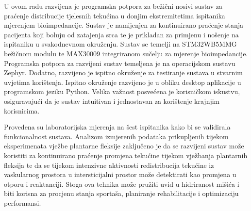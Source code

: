 \documentclass[../diplomski_rad.tex]{subfiles}
\begin{document}
\sloppy

\justifying

U ovom radu razvijena je programska potpora za bežični nosivi sustav za praćenje distribucije tjelesnih tekućina u donjim ekstremitetima
ispitanika mjerenjem bioimpedancije. 
Sustav je namijenjen za kontinuirano praćenje stanja pacijenta koji boluju od zatajenja srca te je prikladan 
za primjenu i nošenje na ispitaniku u svakodnevnom okruženju. 
Sustav se temelji na STM32WB5MMG bežičnom modulu te MAX30009 integriranom sučelju za mjerenje bioimpedancije. 
Programska potpora za razvijeni sustav temeljena je na operacijskom sustavu Zephyr.  
Dodatno, razvijeno je ispitno okruženje
za testiranje sustava u stvarnim uvjetima korištenja. 
Ispitno okruženje razvijeno je u obliku desktop aplikacije u programskom jeziku Python.
Velika važnost posvećena je korisničkom iskustvu, osiguravajući da je sustav intuitivan i 
jednostavan za korištenje krajnjim korisnicima.

Provedena su laboratorijska mjerenja na šest ispitanika kako bi se validirala funkcionalnost sustava. Analizom izmjerenih podataka prikupljenih tijekom eksperimenata vježbe plantarne fleksije zaključeno je da se razvijeni sustav može koristiti za kontinuirano praćenje promjena tekućine tijekom vježbanja plantarnih fleksija te da se tijekom intenzivne aktivnosti redistribucija tekućine iz vaskularnog prostora u intersticijalni prostor može detektirati kao promjena u otporu i reaktanciji. Stoga ova tehnika može pružiti uvid u hidriranost mišića i biti korisna za procjenu stanja sportaša, planiranje rehabilitacije i optimizaciju performansi.
\end{document}
